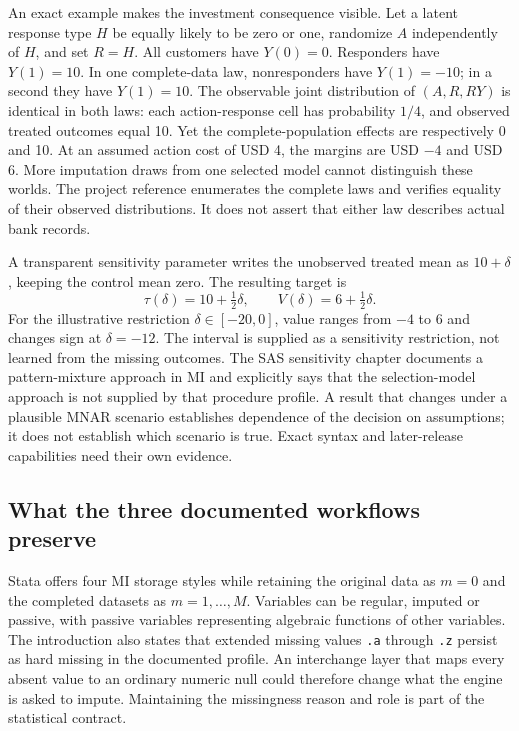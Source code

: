 An exact example makes the investment consequence visible. Let a latent response
type $H$ be equally likely to be zero or one, randomize $A$ independently of
$H$, and set $R=H$. All customers have $Y(0)=0$. Responders have $Y(1)=10$.
In one complete-data law, nonresponders have $Y(1)=-10$; in a second they have
$Y(1)=10$. The observable joint distribution of $(A,R,RY)$ is identical in
both laws: each action-response cell has probability $1/4$, and observed treated
outcomes equal 10. Yet the complete-population effects are respectively 0 and
10. At an assumed action cost of USD 4, the margins are USD $-4$ and USD 6.
More imputation draws from one selected model cannot distinguish these worlds.
The project reference enumerates the complete laws and verifies equality of
their observed distributions. It does not assert that either law describes
actual bank records. \citep{exec21_transport_reference}

A transparent sensitivity parameter writes the unobserved treated mean as
$10+\delta$, keeping the control mean zero. The resulting target is
\begin{equation}
 \tau(\delta)=10+\tfrac12\delta,\qquad
 V(\delta)=6+\tfrac12\delta.
 \label{exec21:transport-sensitivity}
\end{equation}
For the illustrative restriction $\delta\in[-20,0]$, value ranges from $-4$
to 6 and changes sign at $\delta=-12$. The interval is supplied as a sensitivity
restriction, not learned from the missing outcomes. The SAS sensitivity chapter
documents a pattern-mixture approach in MI and explicitly says that the
selection-model approach is not supplied by that procedure profile. A result
that changes under a plausible MNAR scenario establishes dependence of the
decision on assumptions; it does not establish which scenario is true. Exact
syntax and later-release capabilities need their own evidence.
\citep{exec21_transport_sas_sensitivity,exec21_transport_reference}

\subsection{What the three documented workflows preserve}
\label{exec21:transport-workflows}

Stata offers four MI storage styles while retaining the original data as
$m=0$ and the completed datasets as $m=1,\ldots,M$. Variables can be regular,
imputed or passive, with passive variables representing algebraic functions
of other variables. The introduction also states that extended missing values
\texttt{.a} through \texttt{.z} persist as hard missing in the documented
profile. An interchange layer that maps every absent value to an ordinary
numeric null could therefore change what the engine is asked to impute.
Maintaining the missingness reason and role is part of the statistical contract.
\citep{exec21_transport_stata_mi}

